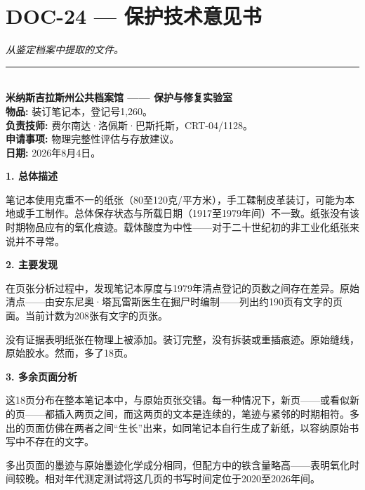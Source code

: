 \section*{\textbf{DOC-24} --- 保护技术意见书}

\noindent \textit{从鉴定档案中提取的文件。}

\vspace{0.5em}\noindent\rule{\textwidth}{0.5pt}\vspace{0.5em}


\\[-0.2em]

\noindent \textbf{米纳斯吉拉斯州公共档案馆 —— 保护与修复实验室}\\
\noindent \textbf{物品:} 装订笔记本，登记号1,260。\\
\noindent \textbf{负责技师:} 费尔南达·洛佩斯·巴斯托斯，CRT-04/1128。\\
\noindent \textbf{申请事项:} 物理完整性评估与存放建议。\\
\noindent\textbf{日期:} 2026年8月4日。

\noindent \textbf{1. 总体描述}

\noindent 笔记本使用克重不一的纸张（80至120克/平方米），手工鞣制皮革装订，可能为本地或手工制作。总体保存状态与所载日期（1917至1979年间）不一致。纸张没有该时期物品应有的氧化痕迹。载体酸度为中性——对于二十世纪初的非工业化纸张来说并不寻常。

\noindent \textbf{2. 主要发现}

\noindent 在页张分析过程中，发现笔记本厚度与1979年清点登记的页数之间存在差异。原始清点——由安东尼奥·塔瓦雷斯医生在掘尸时编制——列出约190页有文字的页面。当前计数为208张有文字的页张。

\noindent 没有证据表明纸张在物理上被添加。装订完整，没有拆装或重插痕迹。原始缝线，原始胶水。然而，多了18页。

\noindent \textbf{3. 多余页面分析}

\noindent 这18页分布在整本笔记本中，与原始页张交错。每一种情况下，新页——或看似新的页——都插入两页之间，而这两页的文本是连续的，笔迹与紧邻的时期相符。多出的页面仿佛在两者之间“生长”出来，如同笔记本自行生成了新纸，以容纳原始书写中不存在的文字。

\noindent 多出页面的墨迹与原始墨迹化学成分相同，但配方中的铁含量略高——表明氧化时间较晚。相对年代测定测试将这几页的书写时间定位于2020至2026年间。

